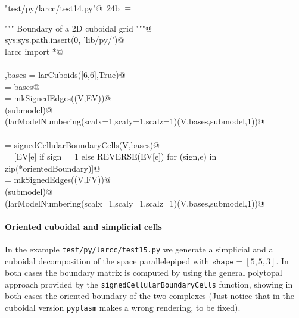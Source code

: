 \documentclass[11pt,oneside]{article}	%
\begin{document}
\begin{flushleft} \small \label{scrap42}
\protect{}\verb@"test/py/larcc/test14.py"@\nobreak\ {\footnotesize 24b }$\equiv$
\vspace{-1ex}
\begin{list}{}{} \item
\mbox{}\verb@""" Boundary of a 2D cuboidal grid """@\\
\mbox{}\verb@import sys;sys.path.insert(0, 'lib/py/')@\\
\mbox{}\verb@from larcc import *@\\
\mbox{}\verb@@\\
\mbox{}\verb@V,bases = larCuboids([6,6],True)@\\
\mbox{}\verb@[VV,EV,FV] = bases@\\
\mbox{}\verb@submodel = mkSignedEdges((V,EV))@\\
\mbox{}\verb@VIEW(submodel)@\\
\mbox{}\verb@VIEW(larModelNumbering(scalx=1,scaly=1,scalz=1)(V,bases,submodel,1))@\\
\mbox{}\verb@@\\
\mbox{}\verb@orientedBoundary = signedCellularBoundaryCells(V,bases)@\\
\mbox{}\verb@FV = [EV[e] if sign==1 else REVERSE(EV[e])  for (sign,e) in zip(*orientedBoundary)]@\\
\mbox{}\verb@submodel = mkSignedEdges((V,FV))@\\
\mbox{}\verb@VIEW(submodel)@\\
\mbox{}\verb@VIEW(larModelNumbering(scalx=1,scaly=1,scalz=1)(V,bases,submodel,1))@\\
\mbox{}\verb@@{\NWsep}
\end{list}
\vspace{-2ex}
\end{flushleft}

\paragraph{Oriented cuboidal and simplicial cells}
In the example \texttt{test/py/larcc/test15.py} we generate a simplicial and a cuboidal decomposition of the space parallelepiped with $\texttt{shape}=[5,5,3]$.
In both cases the boundary matrix is computed by using the general polytopal approach provided by the \texttt{signedCellularBoundaryCells} function, showing in both cases the oriented boundary of the two complexes
(Just notice that in the cuboidal version \texttt{pyplasm} makes a wrong rendering, to be fixed).
\end{document}
